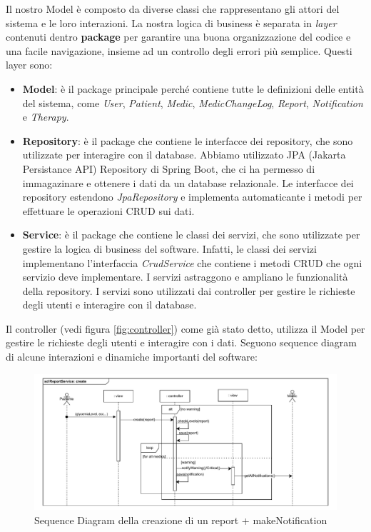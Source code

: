 \documentclass[a4paper]{article}
\begin{document}
Il nostro Model è composto da diverse classi che rappresentano gli attori del sistema e le loro interazioni.
La nostra logica di business è separata in \textit{layer}  contenuti dentro \textbf{package} 
per garantire una buona organizzazione del codice e una facile navigazione, insieme
ad un controllo degli errori più semplice.
Questi layer sono:
\begin{itemize}
  \item \textbf{Model}: è il package principale perché contiene tutte le definizioni delle entità del sistema, come \textit{User}, \textit{Patient}, \textit{Medic}, \textit{MedicChangeLog}, \textit{Report}, \textit{Notification} e \textit{Therapy}.
  \item \textbf{Repository}: è il package che contiene le interfacce dei repository, che sono utilizzate per interagire con il database. 
  Abbiamo utilizzato JPA (Jakarta Persistance API) Repository di Spring Boot, che ci ha permesso di immagazinare e ottenere i dati da un 
  database relazionale. 
  Le interfacce dei repository estendono \textit{JpaRepository} e implementa automaticante i metodi per effettuare le operazioni CRUD sui dati.
  \item \textbf{Service}: è il package che contiene le classi dei servizi, che sono utilizzate per gestire la logica di business del software. 
  Infatti, le classi dei servizi implementano l'interfaccia \textit{CrudService} che contiene i metodi CRUD che ogni servizio deve implementare.
  I servizi astraggono e ampliano le funzionalità della repository.
  I servizi sono utilizzati dai controller per gestire le richieste degli utenti e interagire con il database.
\end{itemize}
Il controller (vedi figura \ref{fig:controller}) come già stato detto, utilizza il Model per 
gestire le richieste degli utenti e interagire con i dati. 
Seguono sequence diagram di alcune interazioni e dinamiche importanti del software:
\begin{figure}[H]
  \begin{center}
    \includegraphics[width=1\textwidth]{sdReportCreate.pdf}
  \end{center}
  \caption{Sequence Diagram della creazione di un report + makeNotification} 
\end{figure}
\noindent
\end{document}
